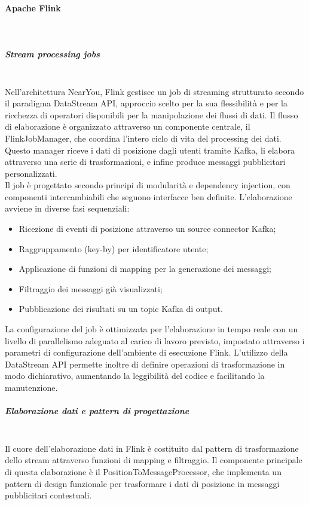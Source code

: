 \documentclass[10pt]{article}
\newcommand{\myparagraph}[1]{\paragraph{#1}\mbox{}\\}
\newcommand{\mysubparagraph}[1]{\subparagraph{#1}\mbox{}\\}
\begin{document}
        \myparagraph{Apache Flink}
        \mysubparagraph{Stream processing jobs}
        Nell'architettura NearYou, Flink gestisce un job di streaming strutturato secondo il paradigma DataStream API, approccio scelto per la sua flessibilità e per la ricchezza di operatori disponibili per la manipolazione dei flussi di dati. Il flusso di elaborazione è organizzato attraverso un componente centrale, il FlinkJobManager, che coordina l'intero ciclo di vita del processing dei dati. Questo manager riceve i dati di posizione dagli utenti tramite Kafka, li elabora attraverso una serie di trasformazioni, e infine produce messaggi pubblicitari personalizzati. \\
        Il job è progettato secondo principi di modularità e dependency injection, con componenti intercambiabili che seguono interfacce ben definite. L'elaborazione avviene in diverse fasi sequenziali:
        
        \begin{itemize}
            \item Ricezione di eventi di posizione attraverso un source connector Kafka;
            \item Raggruppamento (key-by) per identificatore utente;
            \item Applicazione di funzioni di mapping per la generazione dei messaggi;
            \item Filtraggio dei messaggi già visualizzati;
            \item Pubblicazione dei risultati su un topic Kafka di output.
        \end{itemize}
        
        La configurazione del job è ottimizzata per l'elaborazione in tempo reale con un livello di parallelismo adeguato al carico di lavoro previsto, impostato attraverso i parametri di configurazione dell'ambiente di esecuzione Flink. L'utilizzo della DataStream API permette inoltre di definire operazioni di trasformazione in modo dichiarativo, aumentando la leggibilità del codice e facilitando la manutenzione.
        
        \mysubparagraph{Elaborazione dati e pattern di progettazione}
        Il cuore dell'elaborazione dati in Flink è costituito dal pattern di trasformazione dello stream attraverso funzioni di mapping e filtraggio. Il componente principale di questa elaborazione è il PositionToMessageProcessor, che implementa un pattern di design funzionale per trasformare i dati di posizione in messaggi pubblicitari contestuali.
        
\end{document}
